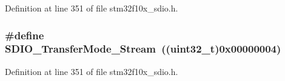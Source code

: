 Definition at line 351 of file stm32f10x\+\_\+sdio.\+h.

\subsubsection[{\texorpdfstring{S\+D\+I\+O\+\_\+\+Transfer\+Mode\+\_\+\+Stream}{SDIO_TransferMode_Stream}}]{\setlength{\rightskip}{0pt plus 5cm}\#define S\+D\+I\+O\+\_\+\+Transfer\+Mode\+\_\+\+Stream~(({\bf uint32\+\_\+t})0x00000004)}\hypertarget{group___s_d_i_o___transfer___type_gadd0cafe0a80e6b6cc5c22d838cbb2e28}{}\label{group___s_d_i_o___transfer___type_gadd0cafe0a80e6b6cc5c22d838cbb2e28}


Definition at line 351 of file stm32f10x\+\_\+sdio.\+h.

